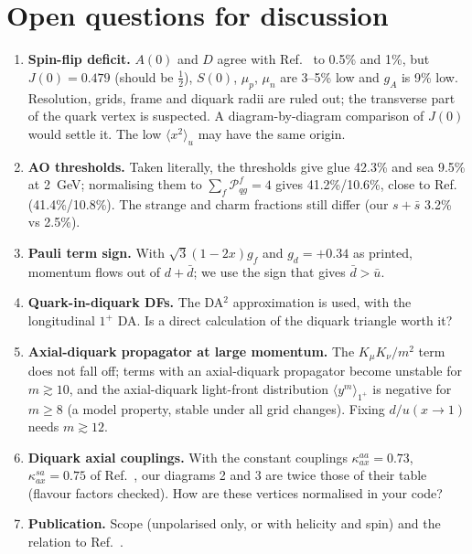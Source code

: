 \documentclass[11pt,a4paper]{article}
\newcommand{\mom}[1]{\langle #1\rangle}
\begin{document}
\section{Open questions for discussion}\label{sec:open}
\begin{enumerate}
\item \textbf{Spin-flip deficit.} $A(0)$ and $D$ agree with Ref.~\cite{Cheng:2026gff} to 0.5\% and 1\%, but $J(0) = 0.479$
  (should be $\tfrac12$), $S(0)$, $\mu_p$, $\mu_n$ are 3--5\% low and $g_A$ is 9\% low. Resolution, grids, frame and
  diquark radii are ruled out; the transverse part of the quark vertex is suspected. A diagram-by-diagram comparison of
  $J(0)$ would settle it. The low $\mom{x^2}_u$ may have the same origin.
\item \textbf{AO thresholds.} Taken literally, the thresholds give glue 42.3\% and sea 9.5\% at 2~GeV; normalising them
  to $\sum_f \mathcal P^f_{qg} = 4$ gives 41.2\%/10.6\%, close to Ref.~\cite{Yu:2025sci} (41.4\%/10.8\%). The strange and
  charm fractions still differ (our $s+\bar s$ 3.2\% vs 2.5\%).
\item \textbf{Pauli term sign.} With $\sqrt3(1-2x)g_f$ and $g_d = +0.34$ as printed, momentum flows out of $d + \bar d$;
  we use the sign that gives $\bar d > \bar u$.
\item \textbf{Quark-in-diquark DFs.} The DA$^2$ approximation is used, with the longitudinal $1^+$ DA. Is a direct
  calculation of the diquark triangle worth it?
\item \textbf{Axial-diquark propagator at large momentum.} The $K_\mu K_\nu/m^2$ term does not fall off; terms with an
  axial-diquark propagator become unstable for $m \gtrsim 10$, and the axial-diquark light-front distribution
  $\mom{y^m}_{1^+}$ is negative for $m \ge 8$ (a model property, stable under all grid changes). Fixing $d/u(x\to1)$ needs
  $m \gtrsim 12$.
\item \textbf{Diquark axial couplings.} With the constant couplings $\kappa^{aa}_{ax} = 0.73$, $\kappa^{sa}_{ax} = 0.75$ of
  Ref.~\cite{Chen:2021guo}, our diagrams 2 and 3 are twice those of their table (flavour factors checked). How are
  these vertices normalised in your code?
\item \textbf{Publication.} Scope (unpolarised only, or with helicity and spin) and the relation to
  Ref.~\cite{Bednar:2018mtf}.
\end{enumerate}
\end{document}

